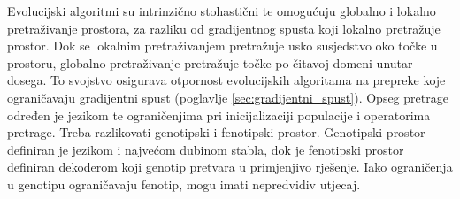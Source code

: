 \documentclass[times, utf8, numeric, diplomski]{fer}
\def\secref#1{(poglavlje \ref{#1})}
\begin{document}
Evolucijski algoritmi su intrinzično stohastični te omogućuju globalno i lokalno pretraživanje prostora, za razliku od gradijentnog spusta koji lokalno pretražuje prostor. Dok se lokalnim pretraživanjem pretražuje usko susjedstvo oko točke u prostoru, globalno pretraživanje pretražuje točke po čitavoj domeni unutar dosega. To svojstvo osigurava otpornost evolucijskih algoritama na prepreke koje ograničavaju gradijentni spust \secref{sec:gradijentni_spust}. Opseg pretrage određen je jezikom te ograničenjima pri inicijalizaciji populacije i operatorima pretrage. Treba razlikovati genotipski i fenotipski prostor. Genotipski prostor definiran je jezikom i najvećom dubinom stabla, dok je fenotipski prostor definiran dekoderom koji genotip pretvara u primjenjivo rješenje. Iako ograničenja u genotipu ograničavaju fenotip, mogu imati nepredvidiv utjecaj.
\end{document}
